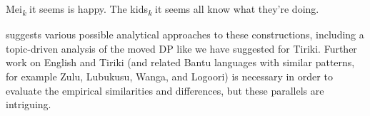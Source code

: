 \documentclass[output=paper,colorlinks,citecolor=brown
]{langscibook}
\begin{document}
\ea \label{ex:johnson:EnglishHr}
\ea Mei\textsubscript{\textit{k}} it seems  is happy. 
\ex The kids\textsubscript{\textit{k}} it seems all  know what they're doing. \\ \citep{Greeson2023EnglishHr}
\z 
\z 

\noindent \citet{Greeson2023EnglishHr} suggests various possible analytical approaches to these constructions, including a topic-driven analysis of the moved DP like we have suggested for Tiriki. Further work on English and Tiriki (and related Bantu languages with similar patterns, for example Zulu, Lubukusu, Wanga, and Logoori) is necessary in order to evaluate the empirical similarities and differences, but these parallels are intriguing. 










\end{document}
